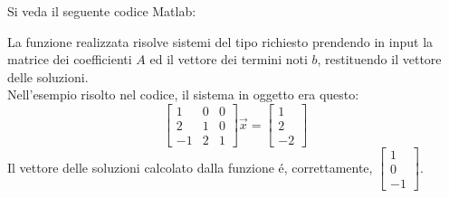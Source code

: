 \begin{center}
\footnotesize\noindent{}\end{center}

\noindent Si veda il seguente codice Matlab:



\noindent La funzione realizzata risolve sistemi del tipo richiesto prendendo in input la matrice dei coefficienti \(A\) ed il vettore dei termini noti \(b\), restituendo il vettore delle soluzioni.
\\
\noindent Nell'esempio risolto nel codice, il sistema in oggetto era questo:
\[
\begin{bmatrix}1 & 0 & 0 \\ 2 & 1 & 0\\ -1 & 2 & 1 \end{bmatrix} \vec{x} = \begin{bmatrix}1 \\ 2 \\ -2 \end{bmatrix}
\]
\noindent Il vettore delle soluzioni calcolato dalla funzione \'e, correttamente, \(\begin{bmatrix}1 \\ 0 \\ -1 \end{bmatrix}\).
